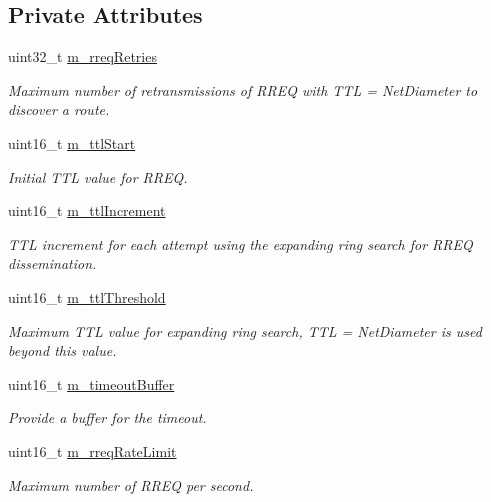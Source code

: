 \subsection*{Private Attributes}
\begin{DoxyCompactItemize}
\item 
uint32\+\_\+t \hyperlink{classns3_1_1aodv_1_1RoutingProtocol_abecbe245cb328bc299a47f9a8a89aa6e}{m\+\_\+rreq\+Retries}
\begin{DoxyCompactList}\small\item\em Maximum number of retransmissions of R\+R\+EQ with T\+TL = Net\+Diameter to discover a route. \end{DoxyCompactList}\item 
uint16\+\_\+t \hyperlink{classns3_1_1aodv_1_1RoutingProtocol_abc9bab73b39d584866faf18e95704e0f}{m\+\_\+ttl\+Start}
\begin{DoxyCompactList}\small\item\em Initial T\+TL value for R\+R\+EQ. \end{DoxyCompactList}\item 
uint16\+\_\+t \hyperlink{classns3_1_1aodv_1_1RoutingProtocol_a7155a27e029832bfd90448bd6ae831db}{m\+\_\+ttl\+Increment}
\begin{DoxyCompactList}\small\item\em T\+TL increment for each attempt using the expanding ring search for R\+R\+EQ dissemination. \end{DoxyCompactList}\item 
uint16\+\_\+t \hyperlink{classns3_1_1aodv_1_1RoutingProtocol_a5fa99f38d3f75c20e1a89f4f2e60c42f}{m\+\_\+ttl\+Threshold}
\begin{DoxyCompactList}\small\item\em Maximum T\+TL value for expanding ring search, T\+TL = Net\+Diameter is used beyond this value. \end{DoxyCompactList}\item 
uint16\+\_\+t \hyperlink{classns3_1_1aodv_1_1RoutingProtocol_a7805d2b1f8e48f3609f8770255a71e47}{m\+\_\+timeout\+Buffer}
\begin{DoxyCompactList}\small\item\em Provide a buffer for the timeout. \end{DoxyCompactList}\item 
uint16\+\_\+t \hyperlink{classns3_1_1aodv_1_1RoutingProtocol_a543abca2b224dcde1362f1050f1887c7}{m\+\_\+rreq\+Rate\+Limit}
\begin{DoxyCompactList}\small\item\em Maximum number of R\+R\+EQ per second. \end{DoxyCompactList}\item 

\end{DoxyCompactItemize}

